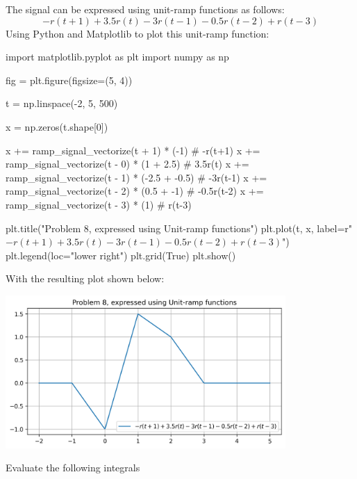 \documentclass[a4paper, 10pt]{article}
\begin{document}
\begin{solution}
The signal can be expressed using unit-ramp functions as follows:
\[
    -r(t+1)+3.5r(t)-3r(t-1)-0.5r(t-2)+r(t-3)
\]
Using Python and Matplotlib to plot this unit-ramp function:
\begin{codingbox}
import matplotlib.pyplot as plt
import numpy as np

fig = plt.figure(figsize=(5, 4))

t = np.linspace(-2, 5, 500)

x = np.zeros(t.shape[0])

x += ramp_signal_vectorize(t + 1) * (-1)            # -r(t+1)
x += ramp_signal_vectorize(t - 0) * (1 + 2.5)       # 3.5r(t)
x += ramp_signal_vectorize(t - 1) * (-2.5 + -0.5)   # -3r(t-1)
x += ramp_signal_vectorize(t - 2) * (0.5 + -1)      # -0.5r(t-2)
x += ramp_signal_vectorize(t - 3) * (1)             # r(t-3)

plt.title("Problem 8, expressed using Unit-ramp functions")
plt.plot(t, x, label=r"$-r(t+1)+3.5r(t)-3r(t-1)-0.5r(t-2)+r(t-3)$")
plt.legend(loc="lower right")
plt.grid(True)
plt.show()
\end{codingbox}

\newpage

With the resulting plot shown below:
\begin{center}
    \includegraphics[width=0.8\textwidth]{images/problem_8.png}
\end{center}
\end{solution}


\begin{problem}[9]
Evaluate the following integrals
\end{problem}
\end{document}

